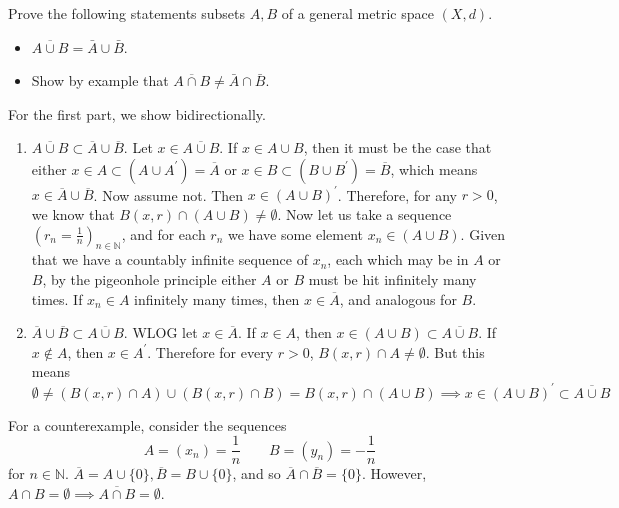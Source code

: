   \begin{exercise}
    Prove the following statements subsets $A,B$ of a general metric space $(X,d)$.
    \begin{itemize}
      \item $\overline{A \cup B} = \bar{A} \cup \bar{B}$.
      \item Show by example that $\overline{A \cap B} \neq \bar{A} \cap \bar{B}$.
    \end{itemize} 
  \end{exercise} 
  \begin{solution}
    For the first part, we show bidirectionally. 
    \begin{enumerate}
      \item $\overline{A \cup B} \subset \overline{A} \cup \overline{B}$. Let $x \in \overline{A \cup B}$. If $x \in A \cup B$, then it must be the case that either $x \in A \subset (A \cup A^\prime) = \overline{A}$ or $x \in B \subset (B \cup B^\prime) = \overline{B}$, which means $x \in \overline{A} \cup \overline{B}$. Now assume not. Then $x \in (A \cup B)^\prime$. Therefore, for any $r > 0$, we know that $B(x, r) \cap (A \cup B) \neq \emptyset$. Now let us take a sequence $(r_n = \frac{1}{n})_{n \in \mathbb{N}}$, and for each $r_n$ we have some element $x_n \in (A \cup B)$. Given that we have a countably infinite sequence of $x_n$, each which may be in $A$ or $B$, by the pigeonhole principle either $A$ or $B$ must be hit infinitely many times. If $x_n \in A$ infinitely many times, then $x \in \overline{A}$, and analogous for $B$. 
      \item $\overline{A} \cup \overline{B} \subset \overline{A \cup B}$. WLOG let $x \in \overline{A}$. If $x \in A$, then $x \in (A \cup B) \subset \overline{A \cup B}$. If $x \not\in A$, then $x \in A^\prime$. Therefore for every $r > 0$, $B(x, r) \cap A \neq \emptyset$. But this means 
      \begin{equation}
        \emptyset \neq (B(x, r) \cap A) \cup (B(x, r) \cap B) = B(x, r) \cap (A \cup B) \implies x \in (A \cup B)^\prime \subset \overline{A \cup B}
      \end{equation}
    \end{enumerate}
    For a counterexample, consider the sequences 
    \begin{equation}
      A = (x_n) = \frac{1}{n} \qquad B = (y_n) = -\frac{1}{n}
    \end{equation}
    for $n \in \mathbb{N}$. $\overline{A} = A \cup \{0\}, \overline{B} = B \cup \{0\}$, and so $\overline{A} \cap \overline{B} = \{0\}$. However, $A \cap B = \emptyset \implies \overline{A \cap B} = \emptyset$. 
  \end{solution}

